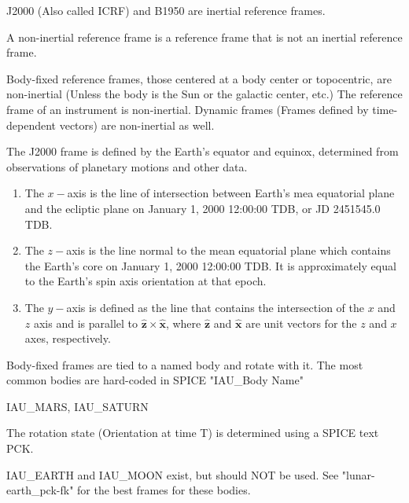 \documentclass[crop=false,class=article,oneside]{standalone}
\begin{document}
            \begin{example}
            J2000 (Also called ICRF) and B1950 are inertial reference frames.
            \end{example}
            \begin{definition}
            A non-inertial reference frame is a reference frame that is not an inertial reference frame.
            \end{definition}
            \begin{example}
            Body-fixed reference frames, those centered at a body center or topocentric, are non-inertial (Unless the body is the Sun or the galactic center, etc.) The reference frame of an instrument is non-inertial. Dynamic frames (Frames defined by time-dependent vectors) are non-inertial as well.
            \end{example}
            \begin{definition}
            The J2000 frame is defined by the Earth's equator and equinox, determined from observations of planetary motions and other data. 
            \begin{enumerate}
                \item The $x-$axis is the line of intersection between Earth's mea equatorial plane and the ecliptic plane on January 1, 2000 12:00:00 TDB, or JD 2451545.0 TDB.
                \item The $z-$axis is the line normal to the mean equatorial plane which contains the Earth's core on January 1, 2000 12:00:00 TDB. It is approximately equal to the Earth's spin axis orientation at that epoch.
                \item The $y-$axis is defined as the line that contains the intersection of the $x$ and $z$ axis and is parallel to $\hat{\mathbf{z}}\times \hat{\mathbf{x}}$, where $\hat{\mathbf{z}}$ and $\hat{\mathbf{x}}$ are unit vectors for the $z$ and $x$ axes, respectively.
            \end{enumerate}
            \end{definition}
            Body-fixed frames are tied to a named body and rotate with it. The most common bodies are hard-coded in SPICE "IAU\_Body Name"
            \begin{example}
            IAU\_MARS, IAU\_SATURN
            \end{example}
            The rotation state (Orientation at time T) is determined using a SPICE text PCK. 
            \begin{remark}
            IAU\_EARTH and IAU\_MOON exist, but should NOT be used. See "lunar-earth\_pck-fk" for the best frames for these bodies.
            \end{remark}
\end{document}

